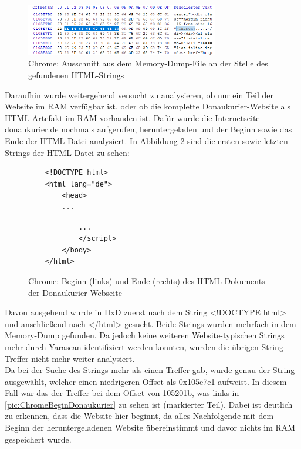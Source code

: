 \begin{figure}[h!]
	\centering
	\includegraphics[width=0.75\textwidth]{bilder/HxDChromeStringThemen_cropped.png}
	\caption{Chrome: Ausschnitt aus dem Memory-Dump-File an der Stelle des gefundenen HTML-Strings}
	\label{pic:ChromeStringThemen}
\end{figure} 

Daraufhin wurde weitergehend versucht zu analysieren, ob nur ein Teil der Website im RAM verfügbar ist, oder ob die komplette Donaukurier-Website als HTML Artefakt im RAM vorhanden ist. Dafür wurde die Internetseite donaukurier.de nochmals aufgerufen, heruntergeladen und der Beginn sowie das Ende der HTML-Datei analysiert. In Abbildung \ref{figure:html-begin-end-dk} sind die ersten sowie letzten Strings der HTML-Datei zu sehen:\\


\begin{figure}[!h]
 \begin{minipage}{0.5\textwidth}
  \centering
	\begin{verbatim}
	<!DOCTYPE html>
	<html lang="de">
		<head>
		...
	\end{verbatim}
 \end{minipage}
 \begin{minipage}{0.5\textwidth}
  \centering
	\begin{verbatim}
			...
	    	</script>
		</body>
	</html>
	\end{verbatim}
 \end{minipage}
\caption{Chrome: Beginn (links) und Ende (rechts) des HTML-Dokuments der Donaukurier Webseite}
  \label{figure:html-begin-end-dk}
\end{figure}


Davon ausgehend wurde in HxD zuerst nach dem String \glqq{}<!DOCTYPE html>\grqq{} und anschließend nach \glqq{}</html>\grqq{} gesucht. Beide Strings wurden mehrfach in dem Memory-Dump gefunden. Da jedoch keine weiteren Website-typischen Strings mehr durch Yarascan identifiziert werden konnten, wurden die übrigen String-Treffer nicht mehr weiter analysiert.\\
Da bei der Suche des Strings mehr als einen Treffer gab, wurde genau der String ausgewählt, welcher einen niedrigeren Offset als 0x105e7e1 aufweist. In diesem Fall war das der Treffer bei dem Offset von 105201b, was links in \autoref{pic:ChromeBeginDonaukurier} zu sehen ist (markierter Teil). Dabei ist deutlich zu erkennen, dass die Website hier beginnt, da alles Nachfolgende mit dem Beginn der heruntergeladenen Website übereinstimmt und davor nichts im RAM gespeichert wurde.

